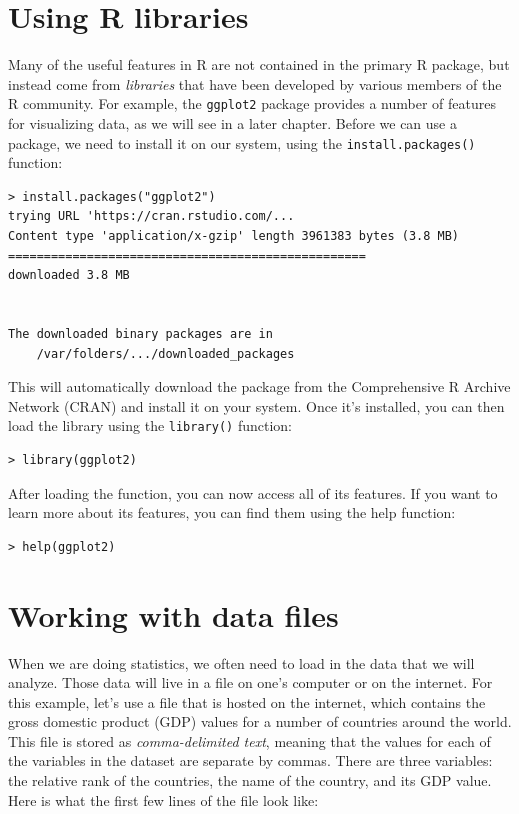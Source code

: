 \documentclass[
  12pt,
]{book}
\begin{document}
\hypertarget{using-r-libraries}{%
\section{Using R libraries}\label{using-r-libraries}}

Many of the useful features in R are not contained in the primary R package, but instead come from \emph{libraries} that have been developed by various members of the R community. For example, the \texttt{ggplot2} package provides a number of features for visualizing data, as we will see in a later chapter. Before we can use a package, we need to install it on our system, using the \texttt{install.packages()} function:

\begin{verbatim}
> install.packages("ggplot2")
trying URL 'https://cran.rstudio.com/...
Content type 'application/x-gzip' length 3961383 bytes (3.8 MB)
==================================================
downloaded 3.8 MB


The downloaded binary packages are in
    /var/folders/.../downloaded_packages
\end{verbatim}

This will automatically download the package from the Comprehensive R Archive Network (CRAN) and install it on your system. Once it's installed, you can then load the library using the \texttt{library()} function:

\begin{verbatim}
> library(ggplot2)
\end{verbatim}

After loading the function, you can now access all of its features. If you want to learn more about its features, you can find them using the help function:

\begin{verbatim}
> help(ggplot2)
\end{verbatim}

\hypertarget{working-with-data-files}{%
\section{Working with data files}\label{working-with-data-files}}

When we are doing statistics, we often need to load in the data that we will analyze. Those data will live in a file on one's computer or on the internet. For this example, let's use a file that is hosted on the internet, which contains the gross domestic product (GDP) values for a number of countries around the world. This file is stored as \emph{comma-delimited text}, meaning that the values for each of the variables in the dataset are separate by commas. There are three variables: the relative rank of the countries, the name of the country, and its GDP value. Here is what the first few lines of the file look like:
\end{document}
